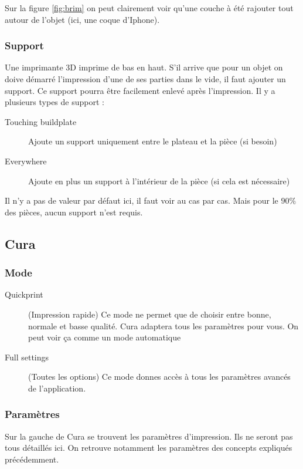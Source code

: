 Sur la figure \ref{fig:brim} on peut clairement voir qu'une couche à été rajouter tout autour de l'objet (ici, une coque d'Iphone).

\subsubsection{Support}

Une imprimante 3D imprime de bas en haut. S'il arrive que pour un objet on doive démarré l'impression d'une de ses parties dans le vide, il faut ajouter un support. Ce support pourra être facilement enlevé après l'impression. Il y a plusieurs types de support :

\begin{description}
\item [Touching buildplate] Ajoute un support uniquement entre le plateau et la pièce (si besoin)
\item[Everywhere] Ajoute en plus un support à l'intérieur de la pièce (si cela est nécessaire)
\end{description}

Il n'y a pas de valeur par défaut ici, il faut voir au cas par cas. Mais pour le $90\%$ des pièces, aucun support n'est requis.

\subsection{Cura}

\subsubsection{Mode}

\begin{description}
\item [Quickprint] (Impression rapide) Ce mode ne permet que de choisir entre bonne, normale et basse qualité. Cura adaptera tous les paramètres pour vous. On peut voir ça comme un mode automatique
\item[Full settings] (Toutes les options) Ce mode donnes accès à tous les paramètres avancés de l'application.
\end{description}

\subsubsection{Paramètres}
Sur la gauche de Cura se trouvent les paramètres d'impression. Ils ne seront pas tous détaillés ici. On retrouve notamment les paramètres des concepts expliqués précédemment.

